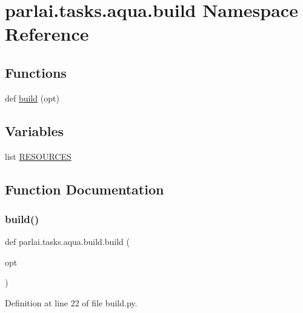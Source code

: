 \hypertarget{namespaceparlai_1_1tasks_1_1aqua_1_1build}{}\section{parlai.\+tasks.\+aqua.\+build Namespace Reference}
\label{namespaceparlai_1_1tasks_1_1aqua_1_1build}
\subsection*{Functions}
\begin{DoxyCompactItemize}
\item 
def \hyperlink{namespaceparlai_1_1tasks_1_1aqua_1_1build_a6b4f6ce85b0fc6e988403a0def089b5a}{build} (opt)
\end{DoxyCompactItemize}
\subsection*{Variables}
\begin{DoxyCompactItemize}
\item 
list \hyperlink{namespaceparlai_1_1tasks_1_1aqua_1_1build_a5471ace3ef77263affdc920e7c92b948}{R\+E\+S\+O\+U\+R\+C\+ES}
\end{DoxyCompactItemize}


\subsection{Function Documentation}
\mbox{\label{namespaceparlai_1_1tasks_1_1aqua_1_1build_a6b4f6ce85b0fc6e988403a0def089b5a}} 
\subsubsection{\texorpdfstring{build()}{build()}}
{\footnotesize\ttfamily def parlai.\+tasks.\+aqua.\+build.\+build (\begin{DoxyParamCaption}\item[{}]{opt }\end{DoxyParamCaption})}



Definition at line 22 of file build.\+py.


